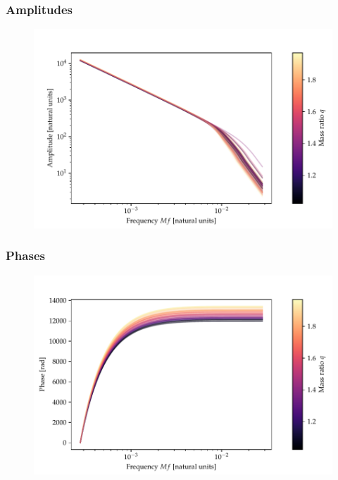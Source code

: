 \documentclass{beamer}
\begin{document}
\begin{frame}
    \frametitle{Amplitudes}
    \begin{figure}[ht]
    \centering
    \includegraphics[width=.95\textwidth]{figures/native_amplitudes}
    \label{fig:native_amplitudes}
    \end{figure}
\end{frame}

\begin{frame}
    \frametitle{Phases}
    \begin{figure}[ht]
    \centering
    \includegraphics[width=.95\textwidth]{figures/native_phases}
    \label{fig:native_phases}
    \end{figure}
\end{frame}
\end{document}
